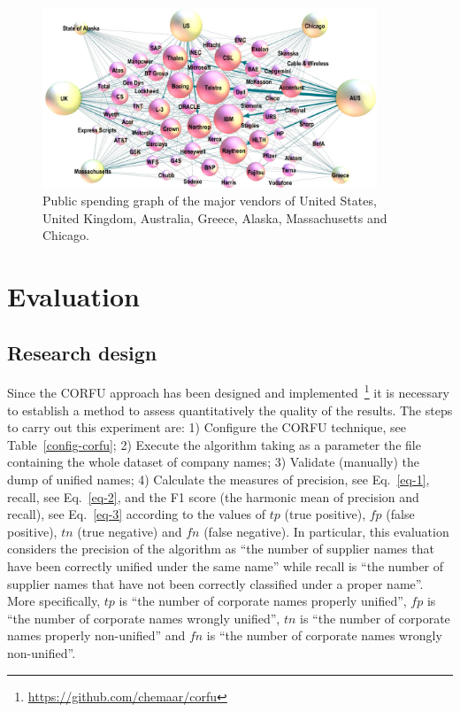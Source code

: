 \documentclass[1p,12pt]{elsarticle}
\begin{document}
\begin{figure}[htb]
		\centering
	\includegraphics[width=10cm]{./imgs/ps-network}
	\caption{Public spending graph of the major vendors of United States, United Kingdom, Australia, Greece, Alaska, Massachusetts and Chicago.}
	\label{fig:results-ps-vendors}
\end{figure}



\section{Evaluation}
\subsection{Research design}
Since the CORFU approach has been designed and implemented~\footnote{\url{https://github.com/chemaar/corfu}} it is necessary to 
establish a method to assess quantitatively the quality of the results.  The steps to carry 
out this experiment are: 1) Configure the CORFU technique, see Table~\ref{config-corfu};  
2) Execute the algorithm taking as a parameter the file containing the whole dataset of company names;
3) Validate (manually) the dump of unified names; 4) Calculate the measures of 
precision, see Eq.~\ref{eq-1}, recall, see Eq.~\ref{eq-2}, and the F1 score (the harmonic mean of precision and recall), see Eq.~\ref{eq-3} according to the values of $tp$ (true positive), 
$fp$ (false positive), $tn$ (true negative) and $fn$ (false negative). In particular, this evaluation considers the precision of the algorithm as ``the number of supplier names that have been correctly unified under the same name'' while recall is 
``the number of supplier names that have not been correctly classified under a proper name''.  More specifically, $tp$ is ``the number of corporate names properly unified'', $fp$ is 
``the number of corporate names wrongly unified'', $tn$ is ``the number of corporate names properly non-unified'' and $fn$ is ``the number of corporate names wrongly non-unified''.
\end{document}

